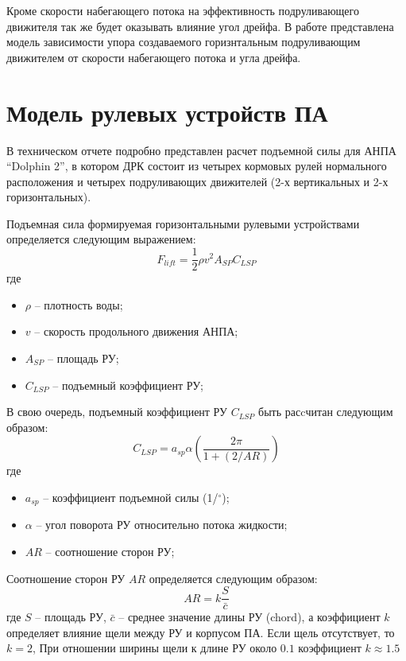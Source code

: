 Кроме скорости набегающего потока на эффективность подруливающего движителя так же будет оказывать влияние угол дрейфа.
В работе \cite{palmer2008modelling} представлена модель зависимости упора создаваемого горизнтальным подруливающим движителем от скорости набегающего потока и угла дрейфа.

\section{Модель рулевых устройств ПА}
В техническом отчете \cite{steenson2011control} подробно представлен расчет подъемной силы для АНПА ``Dolphin 2'', в котором ДРК состоит из четырех кормовых рулей нормального расположения и четырех подруливающих движителей (2-х вертикальных и 2-х горизонтальных).

Подъемная сила формируемая горизонтальными рулевыми устройствами определяется следующим выражением:
\begin{equation*}
    F_{lift} = \frac{1}{2}\rho v^2 A_{SP} C_{LSP}
\end{equation*}
\noindent где
\begin{itemize}
    \item $\rho$ -- плотность воды;
    \item $v$ -- скорость продольного движения АНПА;
    \item $A_{SP}$ -- площадь РУ;
    \item $C_{LSP}$ -- подъемный коэффициент РУ;
\end{itemize}

В свою очередь, подъемный коэффициент РУ $C_{LSP}$ быть расcчитан следующим образом:
\begin{equation*}
    C_{LSP} = a_{sp}\alpha \left( \frac{2 \pi}{1 + (2/AR)} \right)
\end{equation*}
\noindent где
\begin{itemize}
    \item $a_{sp}$ -- коэффициент подъемной силы (1/$^\circ$);
    \item $\alpha$ -- угол поворота РУ относительно потока жидкости;
    \item $AR$ -- соотношение сторон РУ;
\end{itemize}

Соотношение сторон РУ $AR$ определяется следующим образом:
\begin{equation*}
    AR = k \frac{S}{\bar{c}}
\end{equation*}
\noindent где $S$ -- площадь РУ, $\bar{c}$ -- среднее значение длины РУ (chord), а коэффициент $k$ определяет влияние щели между РУ и корпусом ПА. Если щель отсутствует, то $k=2$, При отношении ширины щели к длине РУ около $0.1$ коэффициент $k\approx1.5$

